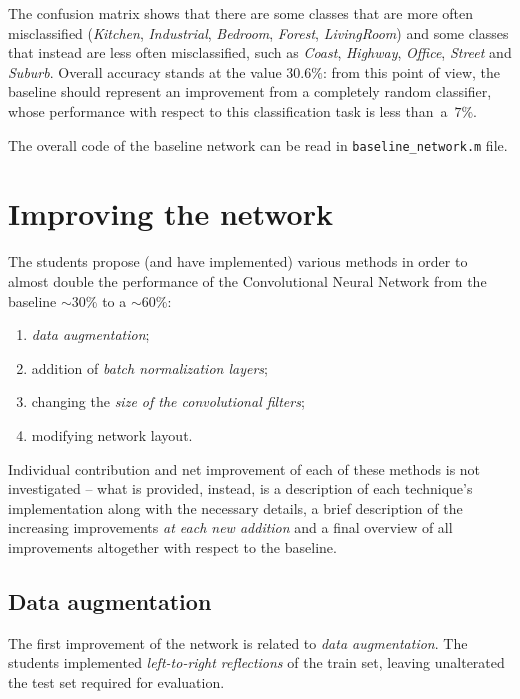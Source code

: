 \documentclass[a4paper, 11pt]{article} %
\begin{document}
The confusion matrix shows that there are some classes that are more often misclassified (\emph{Kitchen}, \emph{Industrial}, \emph{Bedroom}, \emph{Forest}, \emph{LivingRoom}) and some classes that instead are less often misclassified, such as \emph{Coast}, \emph{Highway}, \emph{Office}, \emph{Street} and \emph{Suburb}. Overall accuracy stands at the value $30.6\%$: from this point of view, the baseline should represent an improvement from a completely random classifier, whose performance with respect to this classification task is less than~a~$7\%$.

The overall code of the baseline network can be read in \texttt{baseline\_network.m} file.

\clearpage

\section{Improving the network}\label{sec:improved-network}


The students propose (and have implemented) various methods in order to almost double the performance of the Convolutional Neural Network from the baseline $\sim 30\%$ to a $\sim 60\%$:
\begin{enumerate}
    \item \emph{data augmentation};
    \item addition of \emph{batch normalization layers};
    \item changing the \emph{size of the convolutional filters};
    \item modifying network layout.
\end{enumerate}

Individual contribution and net improvement of each of these methods is not investigated \--- what is provided, instead, is a description of each technique's implementation along with the necessary details, a brief description of the increasing improvements \emph{at each new addition} and a final overview of all improvements altogether with respect to the baseline.

\subsection{Data augmentation}\label{sec:data-augmentation}

The first improvement of the network is related to \emph{data augmentation}. The students implemented \emph{left-to-right reflections} of the train set, leaving unalterated the test set required for evaluation.
\end{document}
